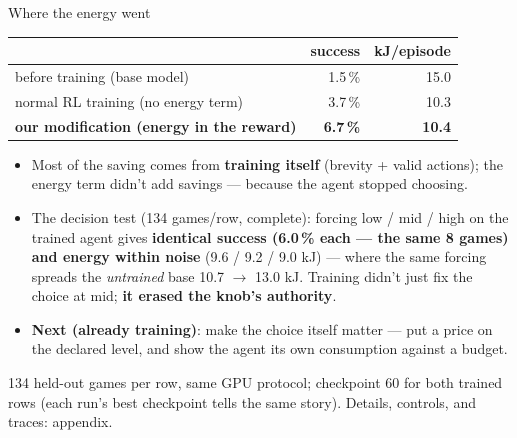 \documentclass[10pt,aspectratio=169]{beamer}
\begin{document}
\begin{frame}{Where the energy went}
\begin{center}\normalsize
\begin{tabular}{@{}lrr@{}}
\toprule
 & success & kJ/episode \\
\midrule
before training (base model) & 1.5\,\% & 15.0 \\
normal RL training (no energy term) & 3.7\,\% & 10.3 \\
\textbf{our modification (energy in the reward)} & \textbf{6.7\,\%} & \textbf{10.4} \\
\bottomrule
\end{tabular}
\end{center}
\vspace{0.3em}\small
\begin{itemize}\itemsep 0.4em
  \item Most of the saving comes from \textbf{training itself} (brevity + valid actions);
        the energy term didn't add savings --- because the agent stopped choosing.
  \item The decision test (134 games/row, complete): forcing low / mid / high on the trained
        agent gives \textbf{identical success (6.0\,\% each --- the same 8 games) and energy
        within noise} (9.6 / 9.2 / 9.0 kJ) --- where the same forcing spreads the
        \emph{untrained} base 10.7 $\rightarrow$ 13.0 kJ. Training didn't just fix the choice
        at mid; \textbf{it erased the knob's authority}.
  \item \textbf{Next (already training)}: make the choice itself matter --- put a price on the
        declared level, and show the agent its own consumption against a budget.
\end{itemize}
\vspace{0.2em}
{\footnotesize 134 held-out games per row, same GPU protocol; checkpoint 60 for both trained rows
(each run's best checkpoint tells the same story). Details, controls, and traces: appendix.}
\end{frame}
\end{document}
